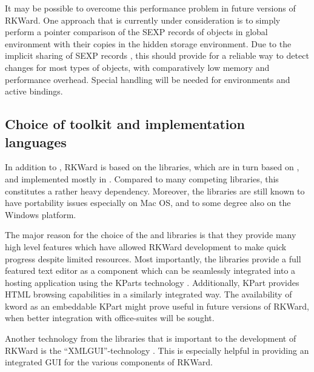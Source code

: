 It may be possible to overcome this performance problem in future versions of
RKWard. One approach that is currently under consideration is to simply perform
a pointer comparison of the SEXP records of objects in global environment with
their copies in the hidden storage environment. Due to the implicit sharing of
SEXP records \citep{RDCT2010a, RDCT2010b}, this should provide for a reliable
way to detect changes for most types of  objects, with comparatively low memory
and performance overhead. Special handling will be needed for environments and
active bindings.

\subsection[technical_toolkit]{Choice of toolkit and implementation languages}
In addition to , RKWard is based on the  libraries, which are in turn based
on , and implemented mostly in . Compared to many competing libraries,
this constitutes a rather heavy dependency. Moreover, the  libraries are
still known to have portability issues especially on Mac OS, and to some degree
also on the Windows platform.

The major reason for the choice of the  and  libraries is that they provide
many high level features which have allowed RKWard development to make quick
progress despite limited resources. Most importantly, the  libraries provide a
full featured text editor \citep{CullmannND} as a component which can be
seamlessly integrated into a hosting application using the KParts technology
\citep{Faure2000}. Additionally, KPart provides HTML browsing capabilities in a
similarly integrated way. The availability of kword \citep{KWord} as an
embeddable KPart might prove useful in future versions of RKWard, when better
integration with office-suites will be sought.

Another technology from the  libraries that is important to the development
of RKWard is the ``XMLGUI''-technology
\citep{Faure2000}. This is especially helpful in providing an integrated GUI for
the various components of RKWard.

